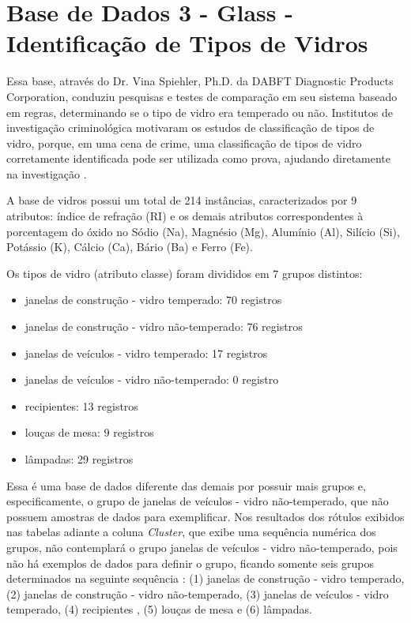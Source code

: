 \section{Base de Dados 3 - Glass - Identificação de Tipos de Vidros}\label{cap:resultados:ssec:iris}


Essa base, através do Dr. Vina Spiehler, Ph.D. da DABFT Diagnostic Products Corporation,  conduziu pesquisas e testes de comparação em seu sistema baseado em regras, determinando se o tipo de vidro era temperado ou não. Institutos de investigação criminológica motivaram os estudos de classificação de tipos de vidro, porque, em uma cena de crime, uma classificação de tipos de vidro corretamente identificada pode ser utilizada como prova, ajudando diretamente na investigação \cite{Evett:1989}.

A base de vidros possui um total de 214 instâncias, caracterizados por 9 atributos: índice de refração (RI) e os demais atributos correspondentes à porcentagem do óxido no Sódio (Na), Magnésio (Mg), Alumínio (Al), Silício (Si), Potássio (K), Cálcio (Ca), Bário (Ba) e Ferro (Fe).

Os tipos de vidro (atributo classe) foram divididos em 7 grupos distintos:
\begin{itemize} [noitemsep]
 \item janelas de construção - vidro temperado: 70 registros
 \item janelas de construção - vidro não-temperado: 76 registros
 \item janelas de veículos - vidro temperado: 17 registros
 \item janelas de veículos - vidro não-temperado: 0 registro
 \item recipientes: 13 registros
 \item louças de mesa: 9 registros
 \item lâmpadas: 29 registros 
\end{itemize}


Essa é uma base de dados diferente das demais por possuir mais grupos e, especificamente, o grupo de janelas de veículos - vidro não-temperado, que não possuem amostras de dados para exemplificar. Nos resultados dos rótulos exibidos nas tabelas adiante a coluna \textit{Cluster}, que exibe uma sequência numérica dos grupos, não contemplará o grupo janelas de veículos - vidro não-temperado, pois não há exemplos de dados para definir o grupo, ficando somente seis grupos determinados na seguinte sequência : (1) janelas de construção - vidro temperado, (2) janelas de construção - vidro não-temperado, (3) janelas de veículos - vidro temperado, (4) recipientes , (5) louças de mesa e (6) lâmpadas. 


